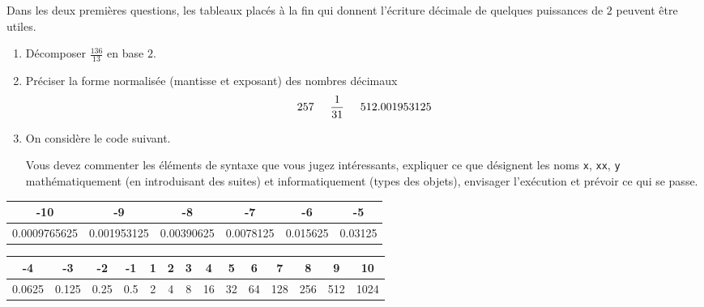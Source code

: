 Dans les deux premières questions, les tableaux placés à la fin qui donnent l'écriture décimale de quelques puissances de $2$ peuvent être utiles.
\begin{enumerate}
  \item Décomposer $\frac{136}{13}$ en base $2$.
  \item Préciser la forme normalisée (mantisse et exposant) des nombres décimaux
  \begin{displaymath}
    257 \hspace{0.5cm} \frac{1}{31} \hspace{0.5cm} 512.001953125
  \end{displaymath}

  \item On considère le code suivant.  

Vous devez commenter les éléments de syntaxe que vous jugez intéressants, expliquer ce que désignent les noms \texttt{x}, \texttt{xx}, \texttt{y} mathématiquement (en  introduisant des suites) et informatiquement (types des objets), envisager l'exécution et prévoir ce qui se passe. 
\end{enumerate}
\begin{center}
  \renewcommand{\arraystretch}{1.5}
\begin{tabular}{|c|c|c|c|c|c|} \hline
  -10        & -9          & -8         & -7        & -6       & -5       \\ \hline
0.0009765625 & 0.001953125 & 0.00390625 & 0.0078125 & 0.015625 & 0.03125  \\  \hline
\end{tabular} 

\vspace{0.5cm}
\begin{tabular}{|c|c|c|c|c|c|c|c|c|c|c|c|c|c|} \hline
 -4    & -3    & -2   & -1  &  1 & 2 & 3 & 4  & 5  & 6  & 7   & 8   & 9   & 10  \\ \hline
0.0625 & 0.125 & 0.25 & 0.5 &  2 & 4 & 8 & 16 & 32 & 64 & 128 & 256 & 512 & 1024 \\  \hline
\end{tabular} 
\end{center}
